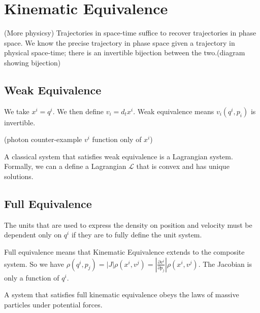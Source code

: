 \documentclass{article}
\begin{document}

\section{Kinematic Equivalence}

\begin{assump}
	(More physicsy) Trajectories in space-time suffice to recover trajectories in phase space. We know the precise trajectory in phase space given a trajectory in physical space-time; there is an invertible bijection between the two.(diagram showing bijection)
\end{assump}

\subsection{Weak Equivalence}

\begin{defn}
	We take $x^i = q^i$. We then define $v_i = d_tx^i$. Weak equivalence means $v_i(q^i, p_i)$ is invertible.
\end{defn}

(photon counter-example $v^i$ function only of $x^i$)

\begin{prop}
	A classical system that satisfies weak equivalence is a Lagrangian system. Formally, we can a define a Lagrangian $\mathcal{L}$ that is convex and has unique solutions.
\end{prop}

\subsection{Full Equivalence}

The units that are used to express the density on position and velocity must be dependent only on $q^i$ if they are to fully define the unit system.

\begin{defn}
	Full equivalence means that Kinematic Equivalence extends to the composite system. So we have $\rho(q^i,p_j) = \left|J\right|\rho(x^i,v^j) = \left|\frac{\partial v^i}{\partial p_j}\right|\rho(x^i,v^j)$. The Jacobian is only a function of $q^i$.
\end{defn}

\begin{prop}
	A system that satisfies full kinematic equivalence obeys the laws of massive particles under potential forces.
\end{prop}
\end{document}
